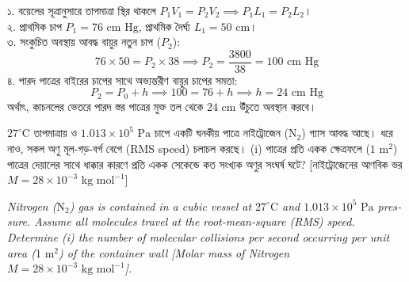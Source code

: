 \documentclass[12pt, a4paper]{article}
\begin{document}
\begin{tcolorbox}[solutionbox={সমাধান (Solution)}]
\noindent
১. বয়েলের সূত্রানুসারে তাপমাত্রা স্থির থাকলে $P_1 V_1 = P_2 V_2 \implies P_1 L_1 = P_2 L_2$। \\
২. প্রাথমিক চাপ $P_1 = 76\text{ cm Hg}$, প্রাথমিক দৈর্ঘ্য $L_1 = 50\text{ cm}$। \\
৩. সংকুচিত অবস্থায় আবদ্ধ বায়ুর নতুন চাপ ($P_2$):
\[ 76 \times 50 = P_2 \times 38 \implies P_2 = \frac{3800}{38} = 100\text{ cm Hg} \]
৪. পারদ পাত্রের বাইরের চাপের সাথে অভ্যন্তরীণ বায়ুর চাপের সমতা:
\[ P_2 = P_0 + h \implies 100 = 76 + h \implies h = 24\text{ cm Hg} \]
অর্থাৎ, কাচনলের ভেতরে পারদ স্তর পাত্রের মুক্ত তল থেকে $24\text{ cm}$ উঁচুতে অবস্থান করবে।
\end{tcolorbox}

\vspace{1.5em}

\begin{tcolorbox}[questionbox={প্রশ্ন (Question) 10}]
\noindent
$27^\circ\text{C}$ তাপমাত্রায় ও $1.013 \times 10^5\text{ Pa}$ চাপে একটি ঘনকীয় পাত্রে নাইট্রোজেন ($\text{N}_2$) গ্যাস আবদ্ধ আছে। ধরে নাও, সকল অণু মূল-গড়-বর্গ বেগে (RMS speed) চলাচল করছে। (i) পাত্রের প্রতি একক ক্ষেত্রফলে ($1\text{ m}^2$) পাত্রের দেয়ালের সাথে ধাক্কার কারণে প্রতি একক সেকেন্ডে কত সংখ্যক অণুর সংঘর্ষ ঘটে? [নাইট্রোজেনের আণবিক ভর $M = 28 \times 10^{-3}\text{ kg mol}^{-1}$]

\vspace{0.8em}
\begin{english}
\noindent\textit{\color{darkgray}
Nitrogen ($\text{N}_2$) gas is contained in a cubic vessel at $27^\circ\text{C}$ and $1.013 \times 10^5\text{ Pa}$ pressure. Assume all molecules travel at the root-mean-square (RMS) speed. Determine (i) the number of molecular collisions per second occurring per unit area ($1\text{ m}^2$) of the container wall [Molar mass of Nitrogen $M = 28 \times 10^{-3}\text{ kg mol}^{-1}$].
}
\end{english}
\end{tcolorbox}

\vspace{1em}
\end{document}
